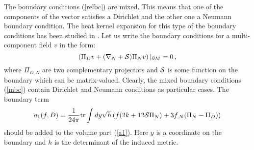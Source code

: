 \documentclass[a4paper,12pt]{article}
\newcommand{\oB}{|_{\partial M}}
\begin{document}
The boundary conditions (\ref{relbc}) are mixed. This means
that one of the components of the vector satisfies a Dirichlet
and the other one a Neumann boundary condition. The heat kernel
expansion for this type of the boundary conditions has been
studied in 
\cite{Moss90,BransonGilkey90,Vassilevich:1995we,Branson:1999jz}.
Let us write the boundary conditions for a multi-component field
$v$ in the form:
\begin{equation}
\left( \Pi_D v +(\nabla_N +{\cal S})\Pi_N v \right) \oB =0
\,,
\label{mbc}
\end{equation}
where $\Pi_{D,N}$ are two complementary projectors and ${\cal S}$
is some function on the boundary which can be matrix-valued.
Clearly, the mixed boundary conditions (\ref{mbc}) contain
Dirichlet and Neumann conditions as particular cases.
The boundary term
\begin{equation}
a_1(f,D)=\frac 1{24\pi}{\rm tr} \int dy \sqrt{h}
\left( f(2k +12{\cal S}\Pi_N ) +3f_{,N}(\Pi_N -\Pi_D)
\right) \label{boua1}
\end{equation}
should be added to the volume part (\ref{a1}). Here $y$ is
a coordinate on the boundary and $h$ is the determinant of the induced
metric. 
\end{document}
